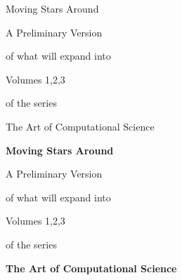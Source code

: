 
\thispagestyle{empty}                 %

\begin{latexonly}

\begin{center}


\hbox{}

\bigskip\bigskip


{\lggggb Moving Stars Around}

\bigskip


\bigskip\bigskip


{\lggb A Preliminary Version}


\medskip


{\lggb of what will expand into}


\medskip

{\lggb Volumes 1,2,3}

\medskip

{\lggb of the series}

\bigskip\bigskip

{\lgggb The Art of Computational Science}

\bigskip\bigskip

\end{center}

\end{latexonly}


\begin{htmlonly}


\begin{center}


\hbox{}

\bigskip\bigskip


{\huge \bf Moving Stars Around}

\medskip


{\LARGE A Preliminary Version}



{\LARGE of what will expand into}


\medskip



{\LARGE Volumes 1,2,3}

\medskip



{\LARGE of the series}


\bigskip


{\huge \bf The Art of Computational Science}



\bigskip


\end{center}
\end{htmlonly}

